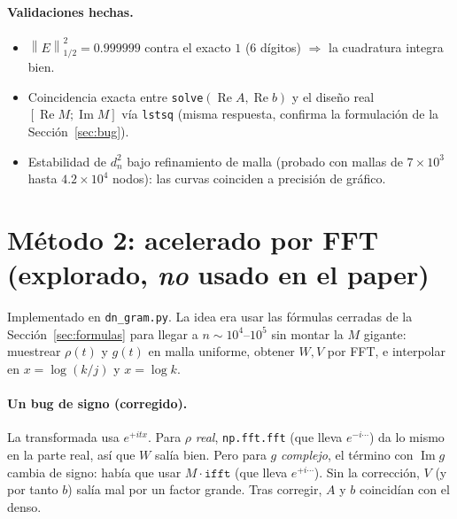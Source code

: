 \documentclass[11pt]{article}
\newcommand{\Reop}{\operatorname{Re}}
\newcommand{\Imop}{\operatorname{Im}}
\newcommand{\norm}[1]{\left\|#1\right\|}
\newcommand{\code}[1]{\texttt{#1}}
\begin{document}
\paragraph{Validaciones hechas.}
\begin{itemize}[leftmargin=*]
  \item $\norm{E}_{1/2}^2=0.999999$ contra el exacto $1$ (6 d\'igitos) $\Rightarrow$
        la cuadratura integra bien.
  \item Coincidencia exacta entre \code{solve}$(\Reop A,\Reop b)$ y el dise\~no real
        $[\Reop M;\Imop M]$ v\'ia \code{lstsq} (misma respuesta, confirma la
        formulaci\'on de la Secci\'on~\ref{sec:bug}).
  \item Estabilidad de $d_n^2$ bajo refinamiento de malla (probado con mallas de
        $7\times10^3$ hasta $4.2\times10^4$ nodos): las curvas coinciden a precisi\'on
        de gr\'afico.
\end{itemize}

\section{M\'etodo 2: acelerado por FFT (explorado, \emph{no} usado en el paper)}
\label{sec:fft}

Implementado en \code{dn\_gram.py}. La idea era usar las f\'ormulas cerradas de la
Secci\'on~\ref{sec:formulas} para llegar a $n\sim10^4$--$10^5$ sin montar la $M$ gigante:
muestrear $\rho(t)$ y $g(t)$ en malla uniforme, obtener $W,V$ por FFT, e interpolar en
$x=\log(k/j)$ y $x=\log k$.

\paragraph{Un bug de signo (corregido).} La transformada usa $e^{+itx}$. Para $\rho$
\emph{real}, \code{np.fft.fft} (que lleva $e^{-i\cdots}$) da lo mismo en la parte real,
as\'i que $W$ sal\'ia bien. Pero para $g$ \emph{complejo}, el t\'ermino con $\Imop g$
cambia de signo: hab\'ia que usar $M\cdot\code{ifft}$ (que lleva $e^{+i\cdots}$).
Sin la correcci\'on, $V$ (y por tanto $b$) sal\'ia mal por un factor grande.
Tras corregir, $A$ y $b$ coincid\'ian con el denso.
\end{document}
